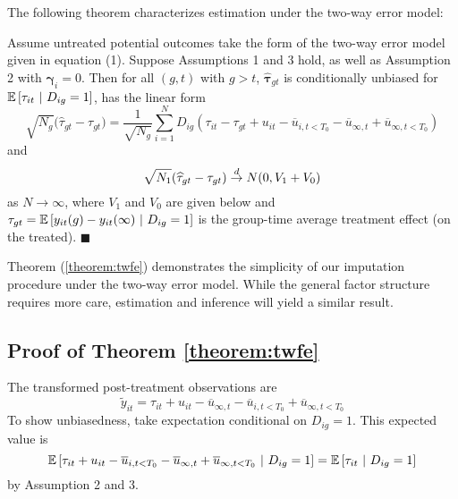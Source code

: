 \documentclass[12pt]{article}
\begin{document}
The following theorem characterizes estimation under the two-way error model:
\begin{theorem}\label{theorem:twfe}
    Assume untreated potential outcomes take the form of the two-way error model given in equation (1). Suppose Assumptions 1 and 3 hold, as well as Assumption 2 with $\bm \gamma_i = 0$. Then for all $(g, t)$ with $g > t$, $\widehat{\bm \tau}_{gt}$ is conditionally unbiased for $\mathbb{E}\left[\tau_{it} \ \vert \ D_{ig} = 1\right]$, has the linear form
    \begin{equation}\label{eq:twfe_influence}
        \sqrt{N_{g}} \big( \widehat{\tau}_{gt} - \tau_{gt} \big) 
        = \frac{1}{\sqrt{N_{g}}}\sum_{i=1}^N D_{ig} (\tau_{it} - \tau_{gt} + u_{it} - \overline{u}_{i,t < T_0} - \overline{u}_{\infty,t} + \overline{u}_{\infty,t < T_0})
    \end{equation}
    and  
    \begin{equation}\label{eq:twfe_asymptotic}
        \sqrt{N_1}(\widehat{\tau}_{gt} - \tau_{gt}) \stackrel{d}{\rightarrow} N(0, V_1 + V_0)
    \end{equation}
    as $N \rightarrow \infty$, where $V_1$ and $V_0$ are given below and $\tau_{gt} = \mathbb{E}\left[y_{it}(g) - y_{it}(\infty) \ \vert \ D_{ig} = 1\right]$ is the group-time average treatment effect (on the treated). $\blacksquare$
\end{theorem}
Theorem (\ref{theorem:twfe}) demonstrates the simplicity of our imputation procedure under the two-way error model. While the general factor structure requires more care, estimation and inference will yield a similar result.


\subsection*{Proof of Theorem \ref{theorem:twfe}}

The transformed post-treatment observations are
\begin{equation}
    \tilde{y}_{it} = \tau_{it} + u_{it} - \overline{u}_{\infty,t}  - \overline{u}_{i,t < T_0} + \overline{u}_{\infty,t < T_0}
\end{equation}
To show unbiasedness, take expectation conditional on $D_{ig} = 1$. This expected value is
\begin{equation}
    \mathbb{E}\left[ \tau_{it} + u_{it} - \overline{u}_{i,t < T_0} - \overline{u}_{\infty,t} + \overline{u}_{\infty,t < T_0}  \ \vert \ D_{ig} = 1\right] = \mathbb{E}\left[\tau_{it} \ \vert \ D_{ig} = 1\right]
\end{equation}
by Assumption 2 and 3.
\end{document}
